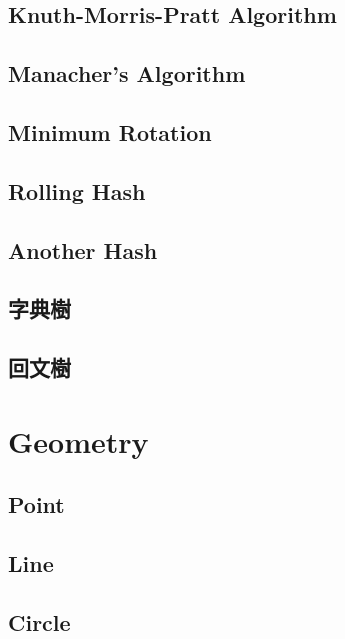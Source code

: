 \documentclass[a4paper,10pt,twocolumn,oneside]{article}
\newcommand{\inputcpp}[1]{}  %
\begin{document}
\subsection{Knuth-Morris-Pratt Algorithm}
\inputcpp{string/KMP.cpp}

\subsection{Manacher's Algorithm}
\inputcpp{string/manacher.cpp}

\subsection{Minimum Rotation}
\inputcpp{string/min_rotation.cpp}

\subsection{Rolling Hash}
\inputcpp{string/rolling_hash.cpp}

\subsection{Another Hash}
\inputcpp{string/string_hash.cpp}

\subsection{字典樹}
\inputcpp{string/Trie.cpp}

\subsection{回文樹}
\inputcpp{string/PalindromeTree.cpp}


\section{Geometry}

\subsection{Point}
\inputcpp{geometry/Point.cpp}

\subsection{Line}
\inputcpp{geometry/Line.cpp}

\subsection{Circle}
\inputcpp{geometry/Circle.cpp}
\end{document}
